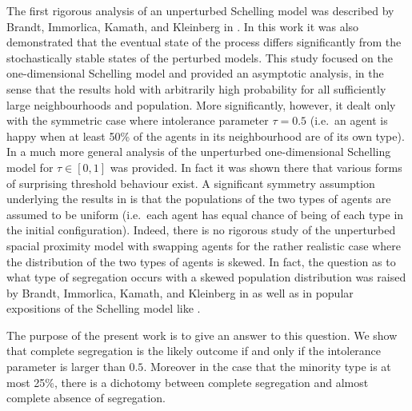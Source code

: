\documentclass[11pt]{article}
\theoremstyle{plain}
\numberwithin{equation}{subsection}
\begin{document}
The first rigorous analysis of an 
unperturbed Schelling model was described 
by  Brandt, Immorlica, Kamath, and Kleinberg
in \cite{brandt:an}. 
In this work it was also demonstrated that the eventual state of the 
process differs significantly from the stochastically stable states of the perturbed models.
This study focused on the one-dimensional Schelling model 
and provided an asymptotic analysis, in the sense that the results hold 
with arbitrarily high probability
for all sufficiently
large neighbourhoods and population.
More significantly, however, it dealt only with the symmetric case where
intolerance parameter $\tau=0.5$  (i.e.\ an agent is happy when at least 50\% of the agents
in its neighbourhood are of its own type). 
 In  \cite{BELschel13}
a much more general analysis of the unperturbed one-dimensional Schelling model
for $\tau\in [0,1]$ was provided. In fact it was shown there that various forms of surprising threshold behaviour exist. 
A significant symmetry assumption underlying 
the results in \cite{brandt:an, BELschel13}
is that
the populations of the two types of agents are assumed to be uniform 
(i.e.\ each agent has equal chance of being of each type in the initial configuration). 
Indeed, there is no rigorous study of the unperturbed spacial proximity model with swapping agents
for the rather realistic  case where the distribution of the two types of agents is skewed.
In fact, the question as to what type of segregation occurs with a skewed population distribution
was raised by  Brandt, Immorlica, Kamath, and Kleinberg 
in \cite[Section 4]{brandt:an} as well as in popular expositions
of the Schelling model like \cite{Hayes}.

The purpose of the present work is to give an answer to this question.
We show that complete segregation is the likely outcome if and only if the intolerance
parameter is larger than $0.5$. Moreover in the case that the minority type is at most 
25\%, there is a dichotomy between complete segregation and almost complete
absence of segregation.
\end{document}
